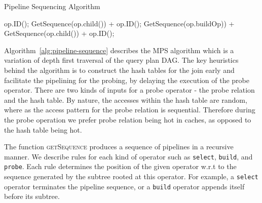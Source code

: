 \begin{algorithm}
	\caption{Pipeline Sequencing Algorithm}
	\begin{algorithmic}[1]
		\State \Return op.ID();
		\EndIf
		\State \Return  GetSequence(op.child()) + op.ID();
		\EndIf	
		\State \Return  GetSequence(op.buildOp)) + GetSequence(op.child()) + op.ID();
		\EndIf	
		\EndFunction		
			
	\end{algorithmic}
	\label{alg:pipeline-sequence}
\end{algorithm}

Algorithm~\ref{alg:pipeline-sequence} describes the MPS algorithm which is a variation of depth first traversal of the query plan DAG. 
The key heuristics behind the algorithm is to construct the hash tables for the join early and facilitate the pipelining for the probing, by delaying the execution of the probe operator.
There are two kinds of inputs for a probe operator - the probe relation and the hash table.
By nature, the accesses within the hash table are random, where as the access pattern for the probe relation is sequential. 
Therefore during the probe operation we prefer probe relation being hot in caches, as opposed to the hash table being hot.

The function \textsc{getSequence} produces a sequence of pipelines in a recursive manner.
We describe rules for each kind of operator such as \texttt{select}, \texttt{build}, and \texttt{probe}.
Each rule determines the position of the given operator w.r.t to the sequence generated by the subtree rooted at this operator.
For example, a \texttt{select} operator terminates the pipeline sequence, or a \texttt{build} operator appends itself before its subtree.

